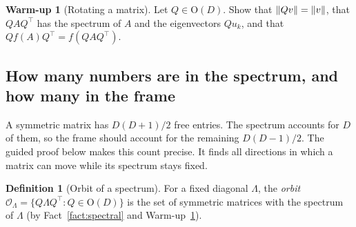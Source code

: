 \documentclass[11pt,a4paper]{article}
\newcommand{\Orth}{\mathrm{O}}
\DeclarePairedDelimiter{\norm}{\lVert}{\rVert}
\theoremstyle{plain}
\theoremstyle{definition}
\newtheorem{definition}[proposition]{Definition}
\newtheorem{warmup}[proposition]{Warm-up}
\theoremstyle{remark}
\begin{document}
\begin{warmup}[Rotating a matrix]\label{wu:rotate}
Let $Q\in\Orth(D)$. Show that $\norm{Qv}=\norm{v}$, that $QAQ^\top$ has the spectrum of $A$ and the eigenvectors
$Qu_k$, and that $Qf(A)Q^\top=f(QAQ^\top)$.
\end{warmup}

\subsection{How many numbers are in the spectrum, and how many in the frame}

A symmetric matrix has $D(D+1)/2$ free entries. The spectrum accounts for $D$ of them, so the frame should account
for the remaining $D(D-1)/2$. The guided proof below makes this count precise. It finds all directions in which a
matrix can move while its spectrum stays fixed.

\begin{definition}[Orbit of a spectrum]\label{def:orbit}
For a fixed diagonal $\Lambda$, the \emph{orbit} $\mathcal{O}_\Lambda=\{Q\Lambda Q^\top:Q\in\Orth(D)\}$ is the set
of symmetric matrices with the spectrum of $\Lambda$ (by Fact~\ref{fact:spectral} and Warm-up~\ref{wu:rotate}).
\end{definition}
\end{document}
